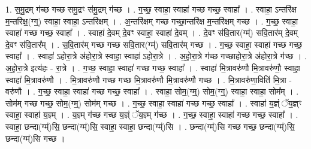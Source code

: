 \documentclass[17pt]{extarticle}
\begin{document}
1. स॒मु॒द्रम् ग॑च्छ गच्छ समु॒द्रꣳ स॑मु॒द्रम् ग॑च्छ । . ग॒च्छ॒ स्वाहा॒ स्वाहा॑ गच्छ गच्छ॒ स्वाहा᳚ । . स्वाहा॒ ऽन्तरि॑क्ष म॒न्तरि॑क्ष॒(ग्ग्॒) स्वाहा॒ स्वाहा॒ ऽन्तरि॑क्षम् । . अ॒न्तरि॑क्षम् गच्छ गच्छा॒न्तरि॑क्ष म॒न्तरि॑क्षम् गच्छ । . ग॒च्छ॒ स्वाहा॒ स्वाहा॑ गच्छ गच्छ॒ स्वाहा᳚ । . स्वाहा॑ दे॒वम् दे॒वꣳ स्वाहा॒ स्वाहा॑ दे॒वम् । . दे॒वꣳ स॑वि॒तार(ग्म्॑) सवि॒तार॑म् दे॒वम् दे॒वꣳ स॑वि॒तार᳚म् । . स॒वि॒तार॑म् गच्छ गच्छ सवि॒तार(ग्म्॑) सवि॒तार॑म् गच्छ । . ग॒च्छ॒ स्वाहा॒ स्वाहा॑ गच्छ गच्छ॒ स्वाहा᳚ । . स्वाहा॑ ऽहोरा॒त्रे अ॑होरा॒त्रे स्वाहा॒ स्वाहा॑ ऽहोरा॒त्रे । . अ॒हो॒रा॒त्रे ग॑च्छ गच्छाहोरा॒त्रे अ॑होरा॒त्रे ग॑च्छ । . अ॒हो॒रा॒त्रे इत्य॑हः - रा॒त्रे । . ग॒च्छ॒ स्वाहा॒ स्वाहा॑ गच्छ गच्छ॒ स्वाहा᳚ । . स्वाहा॑ मि॒त्रावरु॑णौ मि॒त्रावरु॑णौ॒ स्वाहा॒ स्वाहा॑ मि॒त्रावरु॑णौ । . मि॒त्रावरु॑णौ गच्छ गच्छ मि॒त्रावरु॑णौ मि॒त्रावरु॑णौ गच्छ । . मि॒त्रावरु॑णा॒विति॑ मि॒त्रा - वरु॑णौ । . ग॒च्छ॒ स्वाहा॒ स्वाहा॑ गच्छ गच्छ॒ स्वाहा᳚ । . स्वाहा॒ सोम॒(ग्म्॒) सोम॒(ग्ग्॒) स्वाहा॒ स्वाहा॒ सोम᳚म् । . सोम॑म् गच्छ गच्छ॒ सोम॒(ग्म्॒) सोम॑म् गच्छ । . ग॒च्छ॒ स्वाहा॒ स्वाहा॑ गच्छ गच्छ॒ स्वाहा᳚ । . स्वाहा॑ य॒ज्ञ्ं ॅय॒ज्ञ्ꣳ स्वाहा॒ स्वाहा॑ य॒ज्ञ्म् । . य॒ज्ञ्म् ग॑च्छ गच्छ य॒ज्ञ्ं ॅय॒ज्ञ्म् ग॑च्छ । . ग॒च्छ॒ स्वाहा॒ स्वाहा॑ गच्छ गच्छ॒ स्वाहा᳚ । . स्वाहा॒ छन्दा(ग्म्॑)सि॒ छन्दा(ग्म्॑)सि॒ स्वाहा॒ स्वाहा॒ छन्दा(ग्म्॑)सि । . छन्दा(ग्म्॑)सि गच्छ गच्छ॒ छन्दा(ग्म्॑)सि॒ छन्दा(ग्म्॑)सि गच्छ । \newline
\end{document}
